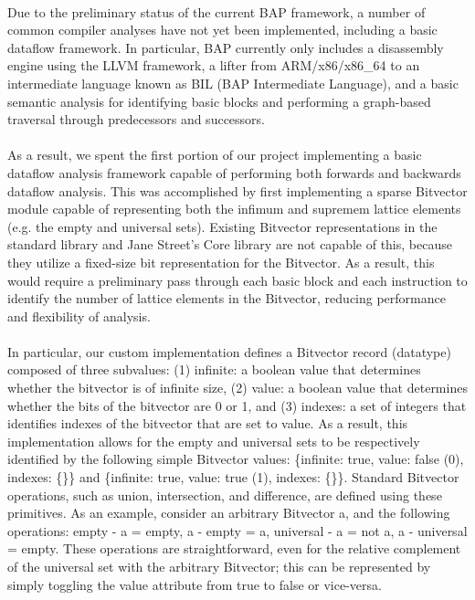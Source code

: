 \documentclass[letterpaper,11pt]{article}
\begin{document}
\paragraph{}
Due to the preliminary status of the current BAP framework, a number of common
compiler analyses have not yet been implemented, including a basic dataflow
framework. In particular, BAP currently only includes a disassembly engine
using the LLVM framework, a lifter from ARM/x86/x86\_64 to an intermediate
language known as BIL (BAP Intermediate Language), and a basic semantic
analysis for identifying basic blocks and performing a graph-based traversal
through predecessors and successors.

\paragraph{}
As a result, we spent the first portion of our project implementing a basic
dataflow analysis framework capable of performing both forwards and backwards
dataflow analysis. This was accomplished by first implementing a sparse
Bitvector module capable of representing both the infimum and supremem lattice
elements (e.g. the empty and universal sets). Existing Bitvector
representations in the standard library and Jane Street’s Core library are not
capable of this, because they utilize a fixed-size bit representation for the
Bitvector. As a result, this would require a preliminary pass through each
basic block and each instruction to identify the number of lattice elements in
the Bitvector, reducing performance and flexibility of analysis.

\paragraph{}
In particular, our custom implementation defines a Bitvector record (datatype)
composed of three subvalues: (1) infinite: a boolean value that determines
whether the bitvector is of infinite size, (2) value: a boolean value that
determines whether the bits of the bitvector are 0 or 1, and (3) indexes: a set
of integers that identifies indexes of the bitvector that are set to value. As
a result, this implementation allows for the empty and universal sets to be
respectively identified by the following simple Bitvector values: \{infinite:
true, value: false (0), indexes: \{\}\} and \{infinite: true, value: true (1),
indexes: \{\}\}. Standard Bitvector operations, such as union, intersection, and
difference, are defined using these primitives. As an example, consider an
arbitrary Bitvector a, and the following operations: empty - a = empty, a -
empty = a, universal - a = not a, a - universal = empty. These operations are
straightforward, even for the relative complement of the universal set with the
arbitrary Bitvector; this can be represented by simply toggling the value
attribute from true to false or vice-versa.
\end{document}
